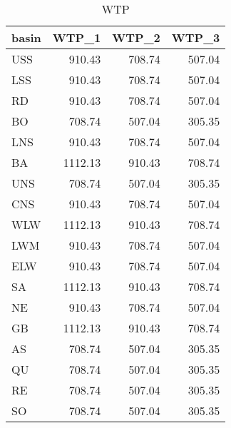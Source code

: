 \begin{table}[ht]
\centering
\begin{tabular}{lrrr}
  \hline
basin & WTP\_1 & WTP\_2 & WTP\_3 \\ 
  \hline
USS & 910.43 & 708.74 & 507.04 \\ 
  LSS & 910.43 & 708.74 & 507.04 \\ 
  RD & 910.43 & 708.74 & 507.04 \\ 
  BO & 708.74 & 507.04 & 305.35 \\ 
  LNS & 910.43 & 708.74 & 507.04 \\ 
  BA & 1112.13 & 910.43 & 708.74 \\ 
  UNS & 708.74 & 507.04 & 305.35 \\ 
  CNS & 910.43 & 708.74 & 507.04 \\ 
  WLW & 1112.13 & 910.43 & 708.74 \\ 
  LWM & 910.43 & 708.74 & 507.04 \\ 
  ELW & 910.43 & 708.74 & 507.04 \\ 
  SA & 1112.13 & 910.43 & 708.74 \\ 
  NE & 910.43 & 708.74 & 507.04 \\ 
  GB & 1112.13 & 910.43 & 708.74 \\ 
  AS & 708.74 & 507.04 & 305.35 \\ 
  QU & 708.74 & 507.04 & 305.35 \\ 
  RE & 708.74 & 507.04 & 305.35 \\ 
  SO & 708.74 & 507.04 & 305.35 \\ 
   \hline
\end{tabular}
\caption{WTP} 
\end{table}

